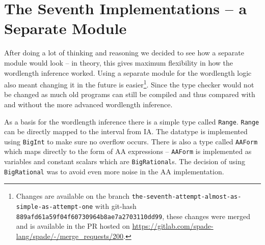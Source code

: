 \section{The Seventh Implementations -- a Separate Module}
\label{sec:Seven}
After doing a lot of thinking and reasoning we decided to see how a separate module would look -- in theory, this gives maximum flexibility in how the wordlength inference worked. Using a separate module for the wordlength logic also meant changing it in the future is easier\cprotect\footnote{Changes are available on the branch \verb+the-seventh-attempt-almost-as-simple-as-attempt-one+ with git-hash \verb+889afd61a59f04f60730964b8ae7a2703110dd99+, these changes were merged and is available in the PR hosted on \url{https://gitlab.com/spade-lang/spade/-/merge_requests/200}.}. Since the type checker would not be changed as much old programs can still be compiled and thus compared with and without the more advanced wordlength inference.%

As a basis for the wordlength inference there is a simple type called \verb+Range+. \verb+Range+ can be directly mapped to the interval from IA. The datatype is implemented using \verb+BigInt+ to make sure no overflow occurs. There is also a type called \verb+AAForm+ which maps directly to the form of AA expressions -- \verb+AAForm+ is implemented as variables and constant scalars which are \verb+BigRational+s. The decision of using \verb+BigRational+ was to avoid even more noise in the AA implementation.


